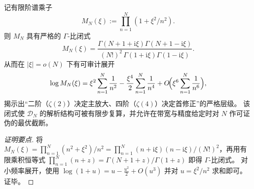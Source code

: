 \begin{conclusion}\label{con:xi-terminal-scale-kernel-gamma-closed-form}
记有限阶谱乘子
\[
M_N(\xi):=\prod_{n=1}^{N}(1+\xi^2/n^2).
\]
则 \(M_N\) 具有严格的 \(\Gamma\)-比闭式
\[
\boxed{\;
M_N(\xi)=\frac{\Gamma(N+1+\mathrm{i}\xi)\Gamma(N+1-\mathrm{i}\xi)}{(N!)^2\,\Gamma(1+\mathrm{i}\xi)\Gamma(1-\mathrm{i}\xi)}.\;}
\]
从而在 \(|\xi|=o(N)\) 下有可审计展开
\[
\log M_N(\xi)=\xi^2\sum_{n=1}^{N}\frac{1}{n^2}-\frac{\xi^4}{2}\sum_{n=1}^{N}\frac{1}{n^4}+O\!\Bigl(\xi^6\sum_{n=1}^{N}\frac{1}{n^6}\Bigr),
\]
揭示出“二阶（\(\zeta(2)\)）决定主放大、四阶（\(\zeta(4)\)）决定首修正”的严格层级。
该闭式使 \(\mathcal D_N\) 的解析结构可被有限步复算，并允许在带宽与精度给定时对 \(N\) 作可证伪的最优截断。
\end{conclusion}
\begin{proof}[证明要点]
将 \(M_N(\xi)=\prod_{n=1}^{N}(n^2+\xi^2)/n^2=\prod_{n=1}^{N}(n+\mathrm{i}\xi)(n-\mathrm{i}\xi)/(N!)^2\)，再用有限乘积恒等式
\(
\prod_{n=1}^{N}(n+z)=\Gamma(N+1+z)/\Gamma(1+z)
\)
即得 \(\Gamma\)-比闭式。
对小频率展开，使用 \(\log(1+u)=u-\frac{u^2}{2}+O(u^3)\) 并对 \(u=\xi^2/n^2\) 求和即可。证毕。
\end{proof}

